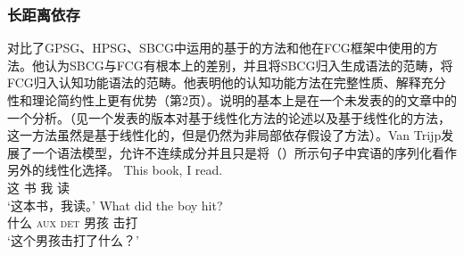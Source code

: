 \subsubsection{长距离依存}
\label{sec-fcg-nld}

 对比了GPSG、HPSG、SBCG中运用的基于\slaschc 的方法和他在FCG框架中使用的方法。他认为SBCG与FCG有根本上的差别，并且将SBCG归入生成语法的范畴，将FCG归入认知功能语法的范畴。他表明他的认知功能方法在完整性质、解释充分性和理论简约性上更有优势（第2页）。\citet{vanTrijp2014a}说明的基本上是\citet{Reape2000a}在一个未发表的的文章中的一个分析。（见一个发表的版本对基于线性化方法的论述以及基于线性化的方法，这一方法虽然是基于线性化的，但是仍然为非局部依存假设了\slaschc 方法）。Van Trijp发展了一个语法模型，允许不连续成分并且只是将（）所示句子中宾语的序列化看作另外的线性化选择。
\eal
\ex 
\gll This book, I read.\\  
    这 书 我 读\\
\glt `这本书，我读。'
\ex 
\gll What did the boy hit?\\  
    什么 \textsc{aux} \textsc{det} 男孩 击打\\
\glt `这个男孩击打了什么？'

